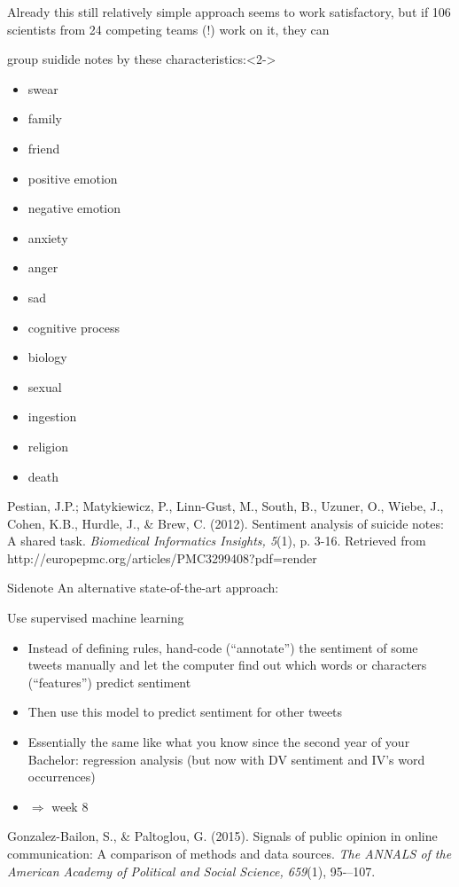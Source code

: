 \documentclass{beamer}
\begin{document}
\begin{frame}{}
	Already this still relatively simple approach seems to work satisfactory, but if 106 scientists from 24 competing teams (!) work on it, they can 
	\begin{block}{group suidide notes by these characteristics:}<2->
		\begin{multicols}{2}
			{\small {
					\begin{itemize}
						\item swear
						\item family
						\item friend
						\item positive emotion
						\item negative emotion
						\item anxiety
						\item anger
						\item sad
						\item cognitive process
						\item biology
						\item sexual
						\item ingestion
						\item religion
						\item death
					\end{itemize}
				}}
			\end{multicols}
		\end{block}
		\par
		\tiny{Pestian, J.P.; Matykiewicz, P., Linn-Gust, M., South, B., Uzuner, O., Wiebe, J., Cohen, K.B., Hurdle, J., \& Brew, C. (2012). Sentiment analysis of suicide notes: A shared task. \emph{Biomedical Informatics Insights, 5}(1), p. 3-16. Retrieved from http://europepmc.org/articles/PMC3299408?pdf=render}\\
	\end{frame}
	
	
	\begin{frame}{Sidenote}
		An alternative state-of-the-art approach:
		\begin{block}{Use supervised machine learning}
			\begin{itemize}
				\item Instead of defining rules, hand-code (``annotate'') the sentiment of some tweets manually and let the computer find out which words or characters (``features'') predict sentiment
				\item Then use this model to predict sentiment for other tweets
				\item Essentially the same like what you know since the second year of your Bachelor: regression analysis (but now with DV sentiment and IV's word occurrences)
				\item $\Rightarrow$ week 8
			\end{itemize}
			\tiny{Gonzalez-Bailon, S., \& Paltoglou, G. (2015). Signals of public opinion in online communication: A comparison of methods and data sources. \emph{The ANNALS of the American Academy of Political and Social Science, 659}(1), 95-–107.}
		\end{block}
		
	\end{frame}
	
\end{document}
